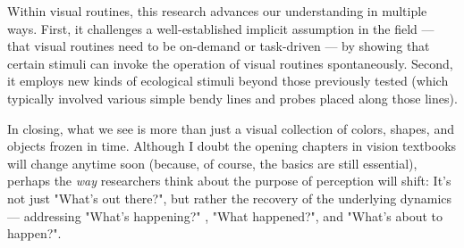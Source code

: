 Within visual routines, this research advances our understanding in multiple ways. First, it challenges a well-established implicit assumption in the field --- that visual routines need to be on-demand or task-driven \parencite{ullman_visual_1984} --- by showing that certain stimuli can invoke the operation of visual routines spontaneously. Second, it employs new kinds of ecological stimuli beyond those previously tested (which typically involved various simple bendy lines and probes placed along those lines).

In closing, what we see is more than just a visual collection of colors, shapes, and objects frozen in time. Although I doubt the opening chapters in vision textbooks will change anytime soon (because, of course, the basics are still essential), perhaps the \textit{way} researchers think about the purpose of perception will shift: It's not just "What's out there?", but rather the recovery of the underlying dynamics --- addressing "What's happening?" , "What happened?", and "What's about to happen?".
